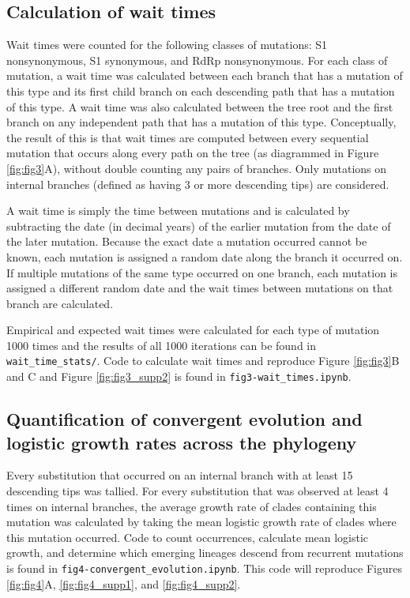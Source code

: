 \documentclass[11pt,oneside,letterpaper]{article}
\begin{document}
\subsection*{Calculation of wait times}
Wait times were counted for the following classes of mutations: S1 nonsynonymous, S1 synonymous, and RdRp nonsynonymous. For each class of mutation, a wait time was calculated between each branch that has a mutation of this type and its first child branch on each descending path that has a mutation of this type. A wait time was also calculated between the tree root and the first branch on any independent path that has a mutation of this type. Conceptually, the result of this is that wait times are computed between every sequential mutation that occurs along every path on the tree (as diagrammed in Figure \ref{fig:fig3}A), without double counting any pairs of branches. Only mutations on internal branches (defined as having 3 or more descending tips) are considered.

A wait time is simply the time between mutations and is calculated by subtracting the date (in decimal years) of the earlier mutation from the date of the later mutation. Because the exact date a mutation occurred cannot be known, each mutation is assigned a random date along the branch it occurred on. If multiple mutations of the same type occurred on one branch, each mutation is assigned a different random date and the wait times between mutations on that branch are calculated.

Empirical and expected wait times were calculated for each type of mutation 1000 times and the results of all 1000 iterations can be found in \texttt{wait\_time\_stats/}. Code to calculate wait times and reproduce Figure \ref{fig:fig3}B and C and Figure \ref{fig:fig3_supp2} is found in \texttt{fig3-wait\_times.ipynb}.

\subsection*{Quantification of convergent evolution and logistic growth rates across the phylogeny}
Every substitution that occurred on an internal branch with at least 15 descending tips was tallied. For every substitution that was observed at least 4 times on internal branches, the average growth rate of clades containing this mutation was calculated by taking the mean logistic growth rate of clades where this mutation occurred. Code to count occurrences, calculate mean logistic growth, and determine which emerging lineages descend from recurrent mutations is found in \texttt{fig4-convergent\_evolution.ipynb}. This code will reproduce Figures \ref{fig:fig4}A, \ref{fig:fig4_supp1}, and \ref{fig:fig4_supp2}.
\end{document}
